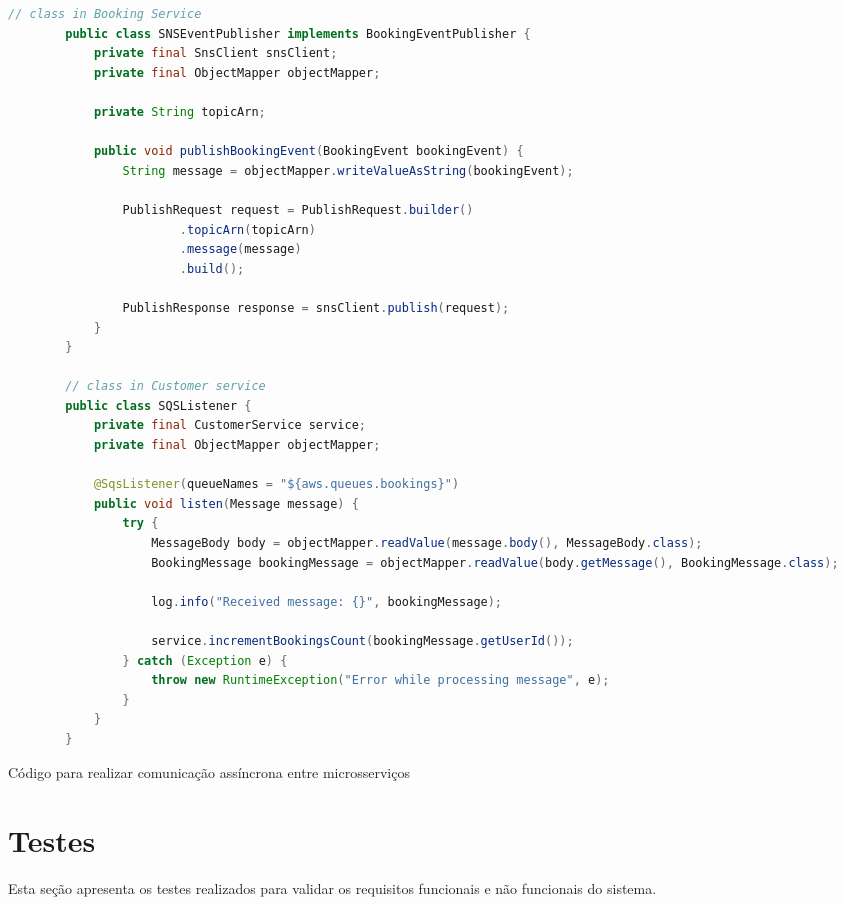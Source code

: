 \begin{codigo}[H]
    \begin{lstlisting}[language=Java]
        // class in Booking Service
        public class SNSEventPublisher implements BookingEventPublisher {
            private final SnsClient snsClient;
            private final ObjectMapper objectMapper;

            private String topicArn;

            public void publishBookingEvent(BookingEvent bookingEvent) {
                String message = objectMapper.writeValueAsString(bookingEvent);

                PublishRequest request = PublishRequest.builder()
                        .topicArn(topicArn)
                        .message(message)
                        .build();

                PublishResponse response = snsClient.publish(request);
            }
        }

        // class in Customer service
        public class SQSListener {
            private final CustomerService service;
            private final ObjectMapper objectMapper;

            @SqsListener(queueNames = "${aws.queues.bookings}")
            public void listen(Message message) {
                try {
                    MessageBody body = objectMapper.readValue(message.body(), MessageBody.class);
                    BookingMessage bookingMessage = objectMapper.readValue(body.getMessage(), BookingMessage.class);

                    log.info("Received message: {}", bookingMessage);

                    service.incrementBookingsCount(bookingMessage.getUserId());
                } catch (Exception e) {
                    throw new RuntimeException("Error while processing message", e);
                }
            }
        }

    \end{lstlisting}
    \caption{Código para realizar comunicação assíncrona entre microsserviços}
    \label{cod:comunicacao-assincrona}
\end{codigo}

\section{Testes}
Esta seção apresenta os testes realizados para validar os requisitos funcionais e não funcionais do sistema.